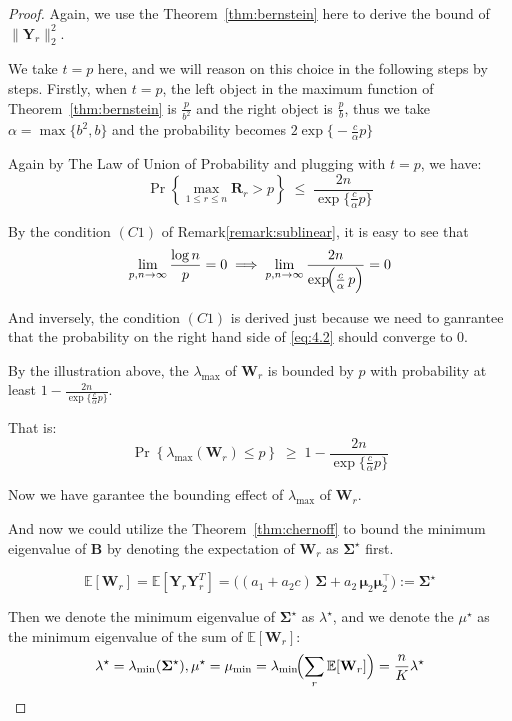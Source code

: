 \documentclass[11pt]{article}
\numberwithin{equation}{section}
\theoremstyle{plain}
\theoremstyle{definition}
\theoremstyle{remark}
\begin{document}
\begin{proof}
Again, we use the Theorem~\ref{thm:bernstein} here to derive the bound of $\|\mathbf{Y}_r\|_2^2$.

We take $t = p$ here, and we will reason on this choice in the following steps by steps. Firstly, when $t = p$, the left object in the maximum function of Theorem~\ref{thm:bernstein} is $\frac{p}{b^2}$ and the right object is $\frac{p}{b}$, thus we take $\alpha = \max\bigl\{b^2,b\bigr\}$ and the probability becomes $2\exp\bigl\{-\frac{c}{\alpha} p\bigr\}$

Again by The Law of Union of Probability and plugging with $t = p$, we have:
\[
  \Pr{\left\{\max_{1\le r\le n} \mathbf{R}_r > p\right\}} \;\le\; \frac{2 n}{\exp\bigl\{\frac{c}{\alpha} p\bigr\}} \tag{4.2}\label{eq:4.2}
\]

By the condition $(C1)$ of Remark\ref{remark:sublinear}, it is easy to see that 
\[
\lim_{p,n \to \infty} \frac{\log n}{p} = 0 \implies  \lim_{p,n \to \infty} \frac{2n}{\exp\!\Bigl(\frac{c}{\alpha}\,p\Bigr)} = 0
\]

And inversely, the condition $(C1)$ is derived just because we need to ganrantee that the probability on the right hand side of \ref{eq:4.2} should converge to 0.

By the illustration above, the $\lambda_{\max}$ of $\mathbf{W}_r$ is bounded by $p$ with probability at least $1 - \frac{2 n}{\exp\bigl\{\frac{c}{\alpha} p\bigr\}}$.  

That is:
\[
  \Pr{\left\{\lambda_{\max}(\mathbf{W}_r) \leq p\right\}} \;\ge\; 1 - \frac{2 n}{\exp\bigl\{\frac{c}{\alpha} p\bigr\}}
\]

Now we have garantee the bounding effect of $\lambda_{\max}$ of $\mathbf{W}_r$.

And now we could utilize the Theorem~\ref{thm:chernoff} to bound the minimum eigenvalue of $\mathbf{B}$ by denoting the expectation of $\mathbf{W}_r$ as $\mathbf{\Sigma}^{\star}$ first.

\[
  \mathbb{E}[\mathbf{W}_r] = \mathbb{E}[\mathbf{Y}_r\mathbf{Y}_r^T] = \bigl((a_{1}+a_{2}c)\,\mathbf{\Sigma} + a_{2}\,\boldsymbol\mu_{2}\boldsymbol\mu_{2}^{\!\top}\bigr) := \mathbf{\Sigma}^{\star}
\]

Then we denote the minimum eigenvalue of \(\mathbf{\Sigma}^{\star}\) as \(\lambda^{\star}\), and we denote the $\mu^{\star}$ as the minimum eigenvalue of the sum of \(\mathbb{E}[\mathbf{W}_r]\):
\[
  \lambda^{\star} = \lambda_{\min}(\mathbf{\Sigma}^{\star}),
  \mu^{\star} = \mu_{\min} = \lambda_{\min}\!\Bigl(\sum_r\mathbb E[\mathbf W_r]\Bigr) = \frac{n}{K}\lambda^{\star}
\]


\end{proof}
\end{document}
